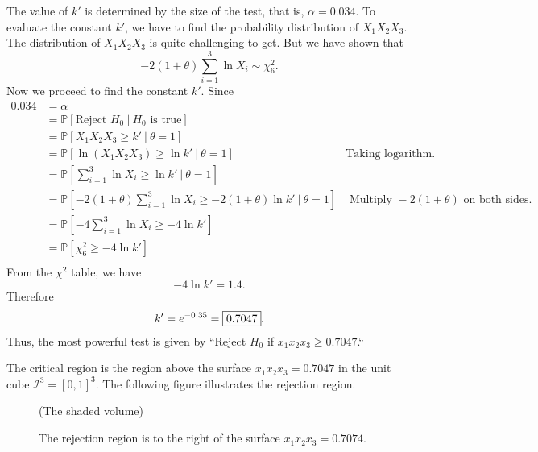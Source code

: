 \begin{solution}
    The value of $k'$ is determined by the size of the test, that is, $\alpha = 0.034$.
    To evaluate the constant $k'$, we have to find the probability distribution of 
    $X_1X_2X_3$. The distribution of $X_1 X_2 X_3$ is quite challenging to get. But we have shown that 
    \[
        -2(1 + \theta) \sum_{i=1}^{3} \ln X_i \sim \chi^2_6.
    \]
    Now we proceed to find the constant $k'$. Since
    \begin{align*}
        0.034 &= \alpha \\
        &= \mathbb{P}[\text{Reject } H_0 \> | \> H_0 \text{ is true}]\\
        &= \mathbb{P}[X_1 X_2 X_3 \geq k' \> | \> \theta = 1]\\
        &= \mathbb{P}[ \ln (X_1 X_2 X_3) \geq \ln k' \> | \> \theta = 1] & \text{Taking logarithm.}\\
        &= \mathbb{P}\left[ \sum^3_{i=1} \ln X_i \geq \ln k' \> \bigg \vert \> \theta = 1\right]\\
        &= \mathbb{P}\left[ -2(1+\theta)\sum^3_{i=1} \ln X_i \geq -2(1+\theta) \ln k' \> \bigg \vert \> \theta = 1\right] & \text{ Multiply } -2(1+\theta) \text{ on both sides.}\\
        &= \mathbb{P}\left[-4 \sum_{i=1}^{3} \ln X_i \geq -4 \ln k' \right]\\
        &= \mathbb{P}\left[\chi^2_6 \geq -4 \ln k' \right]\\
    \end{align*}
    From the $\chi^2$ table, we have
    \[
        - 4 \ln k' = 1.4.
    \]
    Therefore
    \[
        k' = e^{-0.35} = \fbox{$0.7047$}.
    \]
    Thus, the most powerful test is given by ``Reject $H_0$ if $x_1 x_2 x_3 \geq 0.7047$.``

    The critical region is the region above the surface $x_1 x_2 x_3 = 0.7047$ in the unit cube $\mathcal{I}^3 = [0,1]^3$.
The following figure illustrates the rejection region.

\begin{figure}[ht]
    \centering
    \caption{The rejection region is to the right of the surface $x_1 x_2 x_3 = 0.7074$.} (The shaded volume)
\end{figure}
\end{solution}

